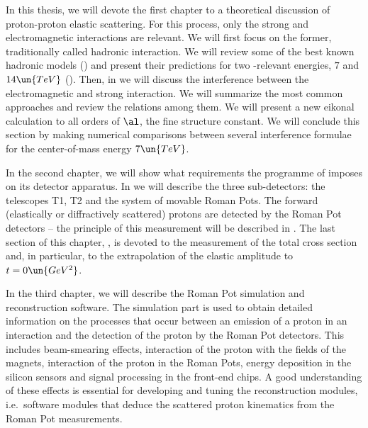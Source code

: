 


In this thesis, we will devote the first chapter to a theoretical discussion of proton-proton elastic scattering. For this process, only the strong and electromagnetic interactions are relevant. We will first focus on the former, traditionally called hadronic interaction. We will review some of the best known hadronic models () and present their predictions for two -relevant energies, $7$ and $14\un{TeV}$ (). Then, in  we will discuss the interference between the electromagnetic and strong interaction. We will summarize the most common approaches and review the relations among them. We will present a new eikonal calculation to all orders of $\al$, the fine structure constant. We will conclude this section by making numerical comparisons between several interference formulae for the center-of-mass energy $7\un{TeV}$.

In the second chapter, we will show what requirements the programme of  imposes on its detector apparatus. In  we will describe the three sub-detectors: the telescopes T1, T2 and the system of movable Roman Pots. The forward (elastically or diffractively scattered) protons are detected by the Roman Pot detectors -- the principle of this measurement will be described in . The last section of this chapter, , is devoted to the measurement of the total cross section and, in particular, to the extrapolation of the elastic amplitude to $t=0\un{GeV^2}$.

In the third chapter, we will describe the Roman Pot simulation and reconstruction software. The simulation part is used to obtain detailed information on the processes that occur between an emission of a proton in an interaction and the detection of the proton by the Roman Pot detectors. This includes beam-smearing effects, interaction of the proton with the fields of the  magnets, interaction of the proton in the Roman Pots, energy deposition in the silicon sensors and signal processing in the front-end chips. A good understanding of these effects is essential for developing and tuning the reconstruction modules, i.e.~software modules that deduce the scattered proton kinematics from the Roman Pot measurements.

